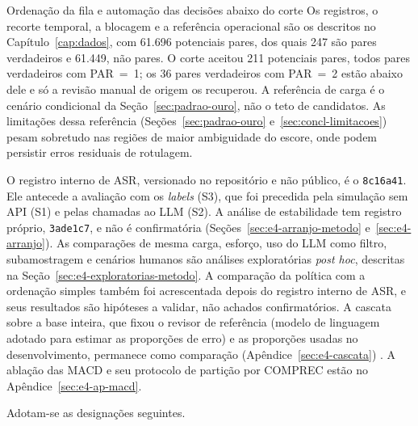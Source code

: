 \begin{chapter}{Ordenação da fila e automação das decisões abaixo do corte}
Os registros, o recorte temporal, a blocagem e a referência operacional são os descritos no Capítulo~\ref{cap:dados}, com 61.696 potenciais pares, dos quais 247 são pares verdadeiros e 61.449, não pares. O corte aceitou 211 potenciais pares, todos pares verdadeiros com PAR~=~1; os 36 pares verdadeiros com PAR~=~2 estão abaixo dele e só a revisão manual de origem os recuperou. A referência de carga é o cenário condicional da Seção~\ref{sec:padrao-ouro}, não o teto de candidatos. As limitações dessa referência (Seções~\ref{sec:padrao-ouro} e~\ref{sec:concl-limitacoes}) pesam sobretudo nas regiões de maior ambiguidade do escore, onde podem persistir erros residuais de rotulagem.

O registro interno de ASR, versionado no repositório e não público, é o \texttt{8c16a41}. Ele antecede a avaliação com os \textit{labels} (S3), que foi precedida pela simulação sem API (S1) e pelas chamadas ao LLM (S2). A análise de estabilidade tem registro próprio, \texttt{3ade1c7}, e não é confirmatória (Seções~\ref{sec:e4-arranjo-metodo} e~\ref{sec:e4-arranjo}). As comparações de mesma carga, esforço, uso do LLM como filtro, subamostragem e cenários humanos são análises exploratórias \textit{post hoc}, descritas na Seção~\ref{sec:e4-exploratorias-metodo}. A comparação da política com a ordenação simples também foi acrescentada depois do registro interno de ASR, e seus resultados são hipóteses a validar, não achados confirmatórios. A cascata sobre a base inteira, que fixou o revisor de referência (modelo de linguagem adotado para estimar as proporções de erro) e as proporções usadas no desenvolvimento, permanece como comparação (Apêndice~\ref{sec:e4-cascata}) \cite{Jardim2026phdrepo}. A ablação das MACD e seu protocolo de partição por COMPREC estão no Apêndice~\ref{sec:e4-ap-macd}.

Adotam-se as designações seguintes.


\end{chapter}
